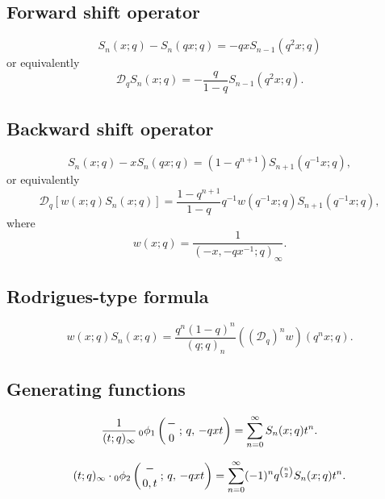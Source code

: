 \documentclass[envcountchap,graybox]{svmono}
\newcommand{\qhyp}[5]{\mbox{}_{#1}{\phi}_{#2}
\left(\genfrac{}{}{0pt}{}{#3}{#4}\,;\,q,\,#5\right)}
\begin{document}
\newpage

\subsection*{Forward shift operator}
\begin{equation}
\label{shift1StieltjesWigertI}
S_n(x;q)-S_n(qx;q)=-qxS_{n-1}(q^2x;q)
\end{equation}
or equivalently
\begin{equation}
\label{shift1StieltjesWigertII}
\mathcal{D}_qS_n(x;q)=-\frac{q}{1-q}S_{n-1}(q^2x;q).
\end{equation}

\subsection*{Backward shift operator}
\begin{equation}
\label{shift2StieltjesWigertI}
S_n(x;q)-xS_n(qx;q)=(1-q^{n+1})S_{n+1}(q^{-1}x;q),
\end{equation}
or equivalently
\begin{equation}
\label{shift2StieltjesWigertII}
\mathcal{D}_q\left[w(x;q)S_n(x;q)\right]=\frac{1-q^{n+1}}{1-q}q^{-1}w(q^{-1}x;q)S_{n+1}(q^{-1}x;q),
\end{equation}
where
$$w(x;q)=\frac{1}{(-x,-qx^{-1};q)_{\infty}}.$$

\subsection*{Rodrigues-type formula}
\begin{equation}
\label{RodStieltjesWigert}
w(x;q)S_n(x;q)=\frac{q^n(1-q)^n}{(q;q)_n}\left(\left(\mathcal{D}_q\right)^n w\right)(q^nx;q).
\end{equation}

\subsection*{Generating functions}
\begin{equation}
\label{GenStieltjesWigert1}
\frac{1}{(t;q)_{\infty}}\,\qhyp{0}{1}{-}{0}{-qxt}=
\sum_{n=0}^{\infty}S_n(x;q)t^n.
\end{equation}

\begin{equation}
\label{GenStieltjesWigert2}
(t;q)_{\infty}\cdot\qhyp{0}{2}{-}{0,t}{-qxt}=
\sum_{n=0}^{\infty}(-1)^nq^{\binom{n}{2}}S_n(x;q)t^n.
\end{equation}
\end{document}
